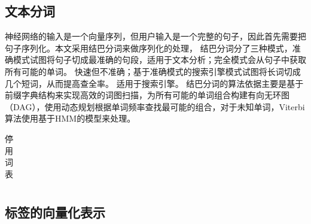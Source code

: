 \subsection{文本分词}
神经网络的输入是一个向量序列，但用户输入是一个完整的句子，因此首先需要把句子序列化。本文采用结巴分词来做序列化的处理，
结巴分词分了三种模式，准确模式试图将句子切成最准确的句段，适用于文本分析；完全模式会从句子中获取所有可能的单词。 快速但不准确；基于准确模式的搜索引擎模式试图将长词切成几个短词，从而提高查全率。 适用于搜索引擎。
结巴分词的算法依据主要是基于前缀字典结构来实现高效的词图扫描，为所有可能的单词组合构建有向无环图（DAG），使用动态规划根据单词频率查找最可能的组合，对于未知单词，Viterbi算法使用基于HMM的模型来处理。

\begin{table}[htb]
  \centering
  \caption{停用词表}
  \label{tab:RelatedResearchAbroad}
    \begin{tabular}{p{4cm}|p{4cm}|p{6cm}}
      \toprule
      
      \bottomrule
    \end{tabular}
\end{table}

\subsection{标签的向量化表示}

